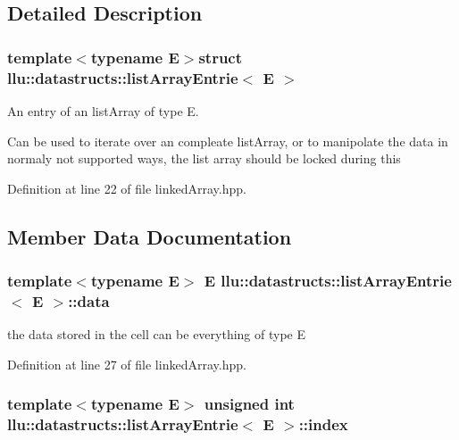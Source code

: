 \subsection{Detailed Description}
\subsubsection*{template$<$typename E$>$struct llu\+::datastructs\+::list\+Array\+Entrie$<$ E $>$}

An entry of an list\+Array of type E. 

Can be used to iterate over an compleate list\+Array, or to manipolate the data in normaly not supported ways, the list array should be locked during this 

Definition at line 22 of file linked\+Array.\+hpp.



\subsection{Member Data Documentation}
\hypertarget{structllu_1_1datastructs_1_1list_array_entrie_a495283bde8e6a508d470e19d39328b39}{
\subsubsection[{data}]{\setlength{\rightskip}{0pt plus 5cm}template$<$typename E$>$ E {\bf llu\+::datastructs\+::list\+Array\+Entrie}$<$ E $>$\+::data}}\label{structllu_1_1datastructs_1_1list_array_entrie_a495283bde8e6a508d470e19d39328b39}


the data stored in the cell can be everything of type E 



Definition at line 27 of file linked\+Array.\+hpp.

\hypertarget{structllu_1_1datastructs_1_1list_array_entrie_aed7349160256aefaca0cf5b4caba9de7}{
\subsubsection[{index}]{\setlength{\rightskip}{0pt plus 5cm}template$<$typename E$>$ unsigned int {\bf llu\+::datastructs\+::list\+Array\+Entrie}$<$ E $>$\+::index}}\label{structllu_1_1datastructs_1_1list_array_entrie_aed7349160256aefaca0cf5b4caba9de7}


